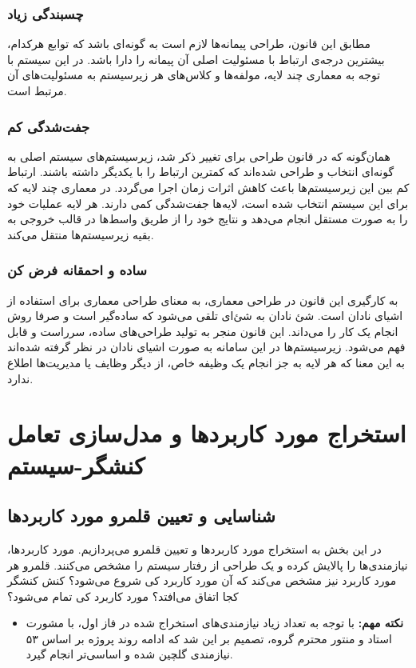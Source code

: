 \documentclass[12pt]{article}
\begin{document}
	\subsubsection{چسبندگی زیاد}
	مطابق این قانون، طراحی پیمانه‌ها لازم است به گونه‌ای باشد که توابع هر‌کدام، بیشترین درجه‌ی ارتباط با مسئولیت اصلی آن پیمانه را دارا باشد. در این سیستم با توجه به معماری چند لایه، مولفه‌ها و کلاس‌های هر زیرسیستم به مسئولیت‌های آن مرتبط است.

	\subsubsection{جفت‌شدگی کم}
	همان‌گونه که در قانون طراحی برای تغییر ذکر شد، زیرسیستم‌های سیستم اصلی به گونه‌ای انتخاب و طراحی شده‌اند که کمترین ارتباط را با یکدیگر داشته باشند. ارتباط کم بین این زیرسیستم‌ها باعث کاهش اثرات زمان اجرا می‌گردد.
	در معماری چند لایه که برای این سیستم انتخاب شده است، لایه‌ها جفت‌شدگی کمی دارند. هر لایه عملیات خود را به صورت مستقل انجام می‌دهد و نتایج خود را از طریق واسط‌ها در قالب خروجی به بقیه زیرسیستم‌ها منتقل می‌کند.

	\subsubsection{ساده و احمقانه فرض کن}
	به کارگیری این قانون در طراحی معماری، به معنای طراحی معماری برای استفاده از اشیای نادان است. شئ نادان به شئ‌ای تلقی می‌شود که ساده‌گیر است و صرفا روش انجام یک کار را می‌داند. این قانون منجر به تولید طراحی‌های ساده، سرراست و قابل فهم می‌شود. زیرسیستم‌ها در این سامانه به صورت اشیای نادان در نظر گرفته شده‌اند به این معنا که هر لایه به جز انجام یک وظیفه خاص، از دیگر وظایف یا مدیریت‌ها اطلاع ندارد.

	\newpage
	\section{استخراج مورد کاربردها و مدل‌سازی تعامل کنشگر-سیستم}
	\subsection{شناسایی و تعیین قلمرو مورد کاربردها}
	در این بخش به استخراج مورد کاربردها و تعیین قلمرو می‌پردازیم. مورد کاربردها، نیازمندی‌ها را پالایش کرده و یک طراحی از رفتار سیستم را مشخص می‌کنند. قلمرو هر مورد کاربرد نیز مشخص می‌کند که آن مورد کاربرد کی شروع می‌شود؟ کنش کنشگر کجا اتفاق می‌افتد؟ مورد کاربرد کی تمام می‌شود؟
	\begin{itemize}
		\item 	\textbf{نکته مهم:}
		با توجه به تعداد زیاد نیازمندی‌های استخراج شده در فاز اول،‌ با مشورت استاد و منتور محترم گروه، تصمیم بر این شد که ادامه روند پروژه بر اساس ۵۳ نیازمندی گلچین شده و اساسی‌تر انجام گیرد.
	\end{itemize}
\end{document}
